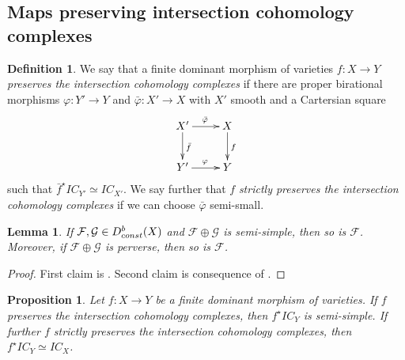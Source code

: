 \documentclass[11pt, reqno]{amsart}
\theoremstyle{plain}
\newtheorem{lemma}[theorem]{Lemma}
\newtheorem{proposition}[theorem]{Proposition}
\theoremstyle{definition}
\newtheorem{definition}[theorem]{Definition}
\theoremstyle{remark}
\begin{document}
\subsection{Maps preserving intersection cohomology complexes}\label{subsec-pullbackfiniteGaction}
 \begin{definition}\label{def1}
We say that a finite dominant morphism of varieties $f:X\rightarrow Y$ \emph{preserves the intersection cohomology complexes}
if there are proper birational morphisms $\varphi: Y'\rightarrow Y$ and $\bar{\varphi}: X'\rightarrow X$ with $X'$ smooth and a  Cartersian square
 $$\xymatrix{
      X'\ar[r]^{\bar{\varphi}} \ar[d] ^{\bar{f}} & X\ar[d]^{f}\\ Y' \ar[r]^{\varphi} & Y }$$ 
such that $\bar{f}^{\star}IC_{Y'}\simeq IC_{X'}$. We say further that $f$ \emph{strictly preserves the intersection cohomology complexes} if we can choose $\bar{\varphi}$ semi-small.
\end{definition}
\begin{lemma}\label{lem-pure}
If $\mathcal{F}, \mathcal{G}\in D^{b}_{\rm const}(X)$ and $\mathcal{F}\oplus \mathcal{G}$ is semi-simple, then 
so is $\mathcal{F}$. Moreover, if  $\mathcal{F}\oplus \mathcal{G}$ is perverse, then so is $\mathcal{F}$.
\end{lemma}
\begin{proof} First claim is \cite[Lemma 15]{BM99}. Second claim is consequence of  \cite[Proposition 1.8]{Wil17}.
\end{proof}
\begin{proposition}\label{propIC}
Let $f: X\rightarrow Y$ be a finite dominant morphism of varieties. If $f$ preserves the intersection cohomology complexes,
then $f^{\star} IC_{Y}$ is semi-simple. If further $f$ strictly preserves the intersection cohomology complexes, then
$f^{\star} IC_{Y}\simeq IC_{X}$.
\end{proposition}
\end{document}
